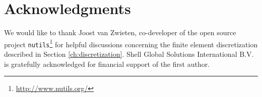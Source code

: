 \section*{Acknowledgments}
We would like to thank Joost van Zwieten, co-developer of the open source project \texttt{nutils}\footnote{\url{http://www.nutils.org/}} for helpful discussions concerning the finite element discretization described in Section \ref{ch:discretization}. Shell Global Solutions International B.V. is gratefully acknowledged for financial support of the first author.


\begin{appendix}

\end{appendix}


